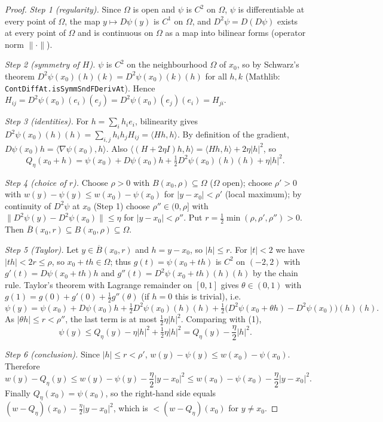 \begin{proof}
\emph{Step 1 (regularity).} Since $\Omega$ is open and $\psi$ is $C^2$ on $\Omega$, $\psi$ is differentiable at every point of $\Omega$, the map $y\mapsto D\psi(y)$ is $C^1$ on $\Omega$, and $D^2\psi=D(D\psi)$ exists at every point of $\Omega$ and is continuous on $\Omega$ as a map into bilinear forms (operator norm $\|\cdot\|$).

\emph{Step 2 (symmetry of $H$).} $\psi$ is $C^2$ on the neighbourhood $\Omega$ of $x_0$, so by Schwarz's theorem $D^2\psi(x_0)(h)(k)=D^2\psi(x_0)(k)(h)$ for all $h,k$ (Mathlib: \texttt{ContDiffAt.isSymmSndFDerivAt}). Hence $H_{ij}=D^2\psi(x_0)(e_i)(e_j)=D^2\psi(x_0)(e_j)(e_i)=H_{ji}$.

\emph{Step 3 (identities).} For $h=\sum_ih_ie_i$, bilinearity gives $D^2\psi(x_0)(h)(h)=\sum_{i,j}h_ih_jH_{ij}=\langle Hh,h\rangle$. By definition of the gradient, $D\psi(x_0)h=\langle\nabla\psi(x_0),h\rangle$. Also $\langle(H+2\eta I)h,h\rangle=\langle Hh,h\rangle+2\eta|h|^2$, so
\[
Q_\eta(x_0+h)=\psi(x_0)+D\psi(x_0)h+\tfrac12D^2\psi(x_0)(h)(h)+\eta|h|^2. \tag{1}
\]

\emph{Step 4 (choice of $r$).} Choose $\rho>0$ with $B(x_0,\rho)\subseteq\Omega$ ($\Omega$ open); choose $\rho'>0$ with $w(y)-\psi(y)\le w(x_0)-\psi(x_0)$ for $|y-x_0|<\rho'$ (local maximum); by continuity of $D^2\psi$ at $x_0$ (Step 1) choose $\rho''\in(0,\rho]$ with $\|D^2\psi(y)-D^2\psi(x_0)\|\le\eta$ for $|y-x_0|<\rho''$. Put $r=\frac12\min(\rho,\rho',\rho'')>0$. Then $\overline B(x_0,r)\subseteq B(x_0,\rho)\subseteq\Omega$.

\emph{Step 5 (Taylor).} Let $y\in\overline B(x_0,r)$ and $h=y-x_0$, so $|h|\le r$. For $|t|<2$ we have $|th|<2r\le\rho$, so $x_0+th\in\Omega$; thus $g(t)=\psi(x_0+th)$ is $C^2$ on $(-2,2)$ with $g'(t)=D\psi(x_0+th)h$ and $g''(t)=D^2\psi(x_0+th)(h)(h)$ by the chain rule. Taylor's theorem with Lagrange remainder on $[0,1]$ gives $\theta\in(0,1)$ with $g(1)=g(0)+g'(0)+\frac12g''(\theta)$ (if $h=0$ this is trivial), i.e.
\[
\psi(y)=\psi(x_0)+D\psi(x_0)h+\tfrac12D^2\psi(x_0)(h)(h)+\tfrac12\bigl(D^2\psi(x_0+\theta h)-D^2\psi(x_0)\bigr)(h)(h).
\]
As $|\theta h|\le r<\rho''$, the last term is at most $\frac12\eta|h|^2$. Comparing with (1),
\[
\psi(y)\le Q_\eta(y)-\eta|h|^2+\tfrac12\eta|h|^2=Q_\eta(y)-\frac\eta2|h|^2 .
\]

\emph{Step 6 (conclusion).} Since $|h|\le r<\rho'$, $w(y)-\psi(y)\le w(x_0)-\psi(x_0)$. Therefore
\[
w(y)-Q_\eta(y)\le w(y)-\psi(y)-\frac\eta2|y-x_0|^2\le w(x_0)-\psi(x_0)-\frac\eta2|y-x_0|^2 .
\]
Finally $Q_\eta(x_0)=\psi(x_0)$, so the right-hand side equals $(w-Q_\eta)(x_0)-\frac\eta2|y-x_0|^2$, which is $<(w-Q_\eta)(x_0)$ for $y\ne x_0$.
\end{proof}
